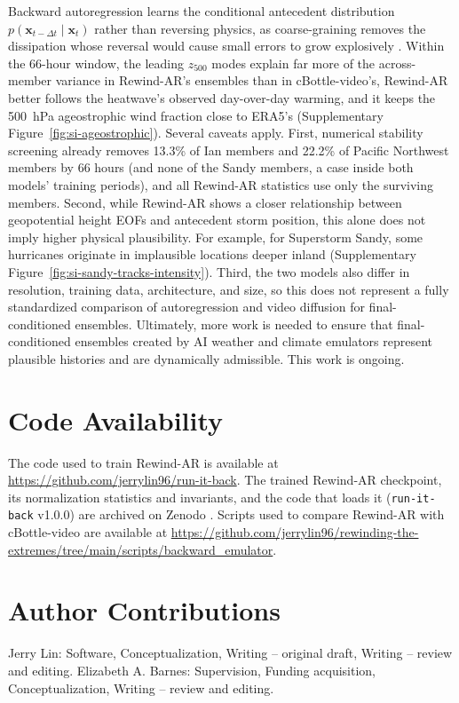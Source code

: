 \documentclass{article}
\begin{document}
Backward autoregression learns the conditional antecedent distribution $p(\mathbf{x}_{t-\Delta t}\mid\mathbf{x}_t)$ rather than reversing physics, as coarse-graining removes the dissipation whose reversal would cause small errors to grow explosively \citep{Hassanzadeh2026-dd}. Within the 66-hour window, the leading $z_{500}$ modes explain far more of the across-member variance in Rewind-AR's ensembles than in cBottle-video's, Rewind-AR better follows the heatwave's observed day-over-day warming, and it keeps the 500~hPa ageostrophic wind fraction close to ERA5's (Supplementary Figure~\ref{fig:si-ageostrophic}). Several caveats apply. First, numerical stability screening already removes 13.3\% of Ian members and 22.2\% of Pacific Northwest members by 66 hours (and none of the Sandy members, a case inside both models' training periods), and all Rewind-AR statistics use only the surviving members. Second, while Rewind-AR shows a closer relationship between geopotential height EOFs and antecedent storm position, this alone does not imply higher physical plausibility. For example, for Superstorm Sandy, some hurricanes originate in implausible locations deeper inland (Supplementary Figure~\ref{fig:si-sandy-tracks-intensity}). Third, the two models also differ in resolution, training data, architecture, and size, so this does not represent a fully standardized comparison of autoregression and video diffusion for final-conditioned ensembles. Ultimately, more work is needed to ensure that final-conditioned ensembles created by AI weather and climate emulators represent plausible histories and are dynamically admissible. This work is ongoing.

\section*{Code Availability}
The code used to train Rewind-AR is available at
\url{https://github.com/jerrylin96/run-it-back}. The trained Rewind-AR
checkpoint, its normalization statistics and invariants, and the code that
loads it (\texttt{run-it-back} v1.0.0) are archived on Zenodo
\citep{Lin2026-ab}. Scripts used to compare
Rewind-AR with cBottle-video are available at
\url{https://github.com/jerrylin96/rewinding-the-extremes/tree/main/scripts/backward_emulator}.

\section*{Author Contributions}
Jerry Lin: Software, Conceptualization, Writing -- original draft, Writing --
review and editing. Elizabeth A. Barnes: Supervision, Funding acquisition,
Conceptualization, Writing -- review and editing.
\end{document}
